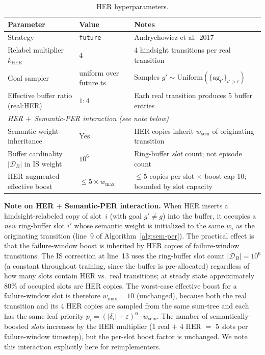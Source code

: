 \begin{table}[t]
\centering
\footnotesize
\caption{HER hyperparameters.}
\label{tab:hparams-her}
\begin{tabular}{l l l}
\toprule
Parameter & Value & Notes \\
\midrule
Strategy & \texttt{future} & Andrychowicz et al.\ 2017 \\
Relabel multiplier $k_{\text{HER}}$ & 4 & 4 hindsight transitions per real transition \\
Goal sampler & uniform over future ts & Samples $g'\!\sim\!\mathrm{Uniform}(\{\text{ag}_{t'}\}_{t'>t})$ \\
Effective buffer ratio (real:HER) & $1\!:\!4$ & Each real transition produces 5 buffer entries \\
\midrule
\multicolumn{3}{l}{\textit{HER$\,+\,$Semantic-PER interaction (see note below)}} \\
Semantic weight inheritance & Yes & HER copies inherit $w_{\text{sem}}$ of originating transition \\
Buffer cardinality $|\mathcal{D}_B|$ in IS weight & $10^6$ & Ring-buffer \emph{slot} count; not episode count \\
HER-augmented effective boost & $\le 5\!\times\!w_{\max}$ & $\le 5$ copies per slot $\times$ boost cap 10; bounded by slot capacity \\
\bottomrule
\end{tabular}
\end{table}

\noindent\textbf{Note on HER$\,+\,$Semantic-PER interaction.}
When HER inserts a hindsight-relabeled copy of slot~$i$ (with goal $g'\!\neq\!g$) into the buffer, it occupies a \emph{new} ring-buffer slot $i'$ whose semantic weight is initialized to the same $w_i$ as the originating transition (line~9 of Algorithm~\ref{alg:sem-per}).  The practical effect is that the failure-window boost is inherited by HER copies of failure-window transitions.  The IS correction at line~13 uses the ring-buffer slot count $|\mathcal{D}_B|\!=\!10^6$ (a constant throughout training, since the buffer is pre-allocated) regardless of how many slots contain HER vs.\ real transitions; at steady state approximately $80\%$ of occupied slots are HER copies.  The worst-case effective boost for a failure-window slot is therefore $w_{\max}\!=\!10$ (unchanged), because both the real transition and its 4 HER copies are sampled from the same sum-tree and each has the same leaf priority $p_i\!=\!(|\delta_i|+\varepsilon)^\alpha\!\cdot\!w_{\text{sem}}$.  The number of semantically-boosted \emph{slots} increases by the HER multiplier (1 real $+$ 4 HER $=$ 5 slots per failure-window timestep), but the per-slot boost factor is unchanged.  We note this interaction explicitly here for reimplementers.

